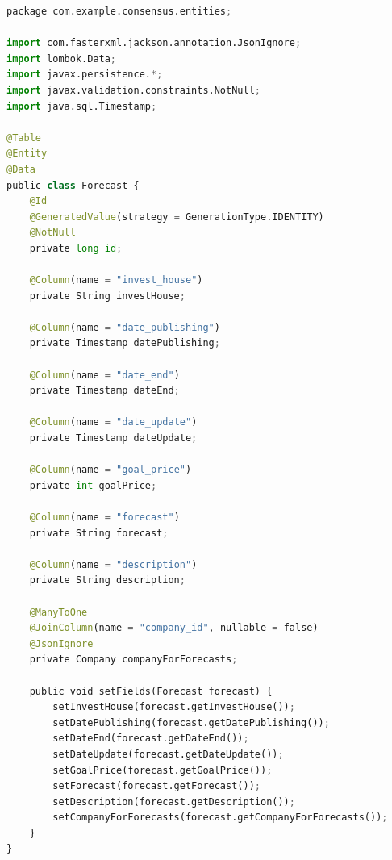 \begin{lstlisting}[label=lst:app2, caption=Сущность Forecast, language=python]
package com.example.consensus.entities;

import com.fasterxml.jackson.annotation.JsonIgnore;
import lombok.Data;
import javax.persistence.*;
import javax.validation.constraints.NotNull;
import java.sql.Timestamp;

@Table
@Entity
@Data
public class Forecast {
	@Id
	@GeneratedValue(strategy = GenerationType.IDENTITY)
	@NotNull
	private long id;

	@Column(name = "invest_house")
	private String investHouse;

	@Column(name = "date_publishing")
	private Timestamp datePublishing;

	@Column(name = "date_end")
	private Timestamp dateEnd;

	@Column(name = "date_update")
	private Timestamp dateUpdate;

	@Column(name = "goal_price")
	private int goalPrice;

	@Column(name = "forecast")
	private String forecast;

	@Column(name = "description")
	private String description;

	@ManyToOne
	@JoinColumn(name = "company_id", nullable = false)
	@JsonIgnore
	private Company companyForForecasts;

	public void setFields(Forecast forecast) {
		setInvestHouse(forecast.getInvestHouse());
		setDatePublishing(forecast.getDatePublishing());
		setDateEnd(forecast.getDateEnd());
		setDateUpdate(forecast.getDateUpdate());
		setGoalPrice(forecast.getGoalPrice());
		setForecast(forecast.getForecast());
		setDescription(forecast.getDescription());
		setCompanyForForecasts(forecast.getCompanyForForecasts());
	}
}
\end{lstlisting}


